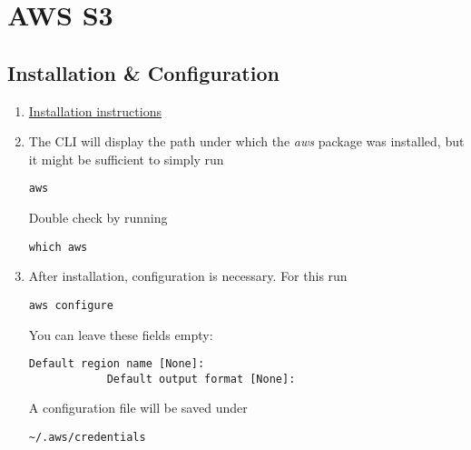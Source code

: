 \documentclass[12pt, a4paper]{scrbook}
\numberwithin{equation}{section}
\theoremstyle{definition}
\theoremstyle{definition}
\begin{document}
	\chapter{AWS S3} 
	
	\section{Installation \& Configuration}
	
	\begin{enumerate}
		\item \href{https://docs.aws.amazon.com/cli/latest/userguide/getting-started-install.html#getting-started-install-instructions}{Installation instructions}
		\item The CLI will display the path under which the \textit{aws} package was installed, but it might be sufficient to simply run 
		
		\begin{lstlisting}[style=mystylebash, label=alg:aws, xleftmargin=\parindent]
			aws
		\end{lstlisting}
		
		Double check by running 
		
		\begin{lstlisting}[style=mystylebash, label=alg:aws_path, xleftmargin=\parindent]
			which aws
		\end{lstlisting}
		
		\item After installation, configuration is necessary. For this run
		
		\begin{lstlisting}[style=mystylebash, label=alg:aws_configure, xleftmargin=\parindent]
			aws configure
		\end{lstlisting}
		
		You can leave these fields empty:
		
		\begin{lstlisting}[style=mystylebash, label=alg:aws_configure__default_reg, xleftmargin=\parindent]
			Default region name [None]:
			Default output format [None]:
		\end{lstlisting}
		
		A configuration file will be saved under 
		
		\begin{lstlisting}[style=mystylebash, label=alg:aws__config_file, xleftmargin=\parindent]
			~/.aws/credentials
		\end{lstlisting}
		

\end{enumerate}
\end{document}
